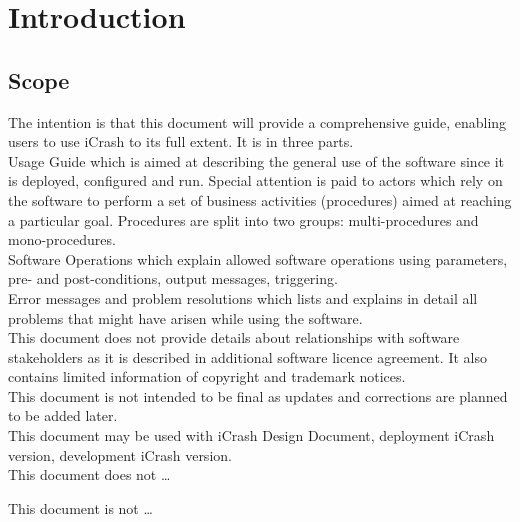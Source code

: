 \chapter{Introduction}
\label{chap:introduction}


\section{Scope}
The intention is that this document will provide a comprehensive guide, enabling
users to use iCrash to its full extent. It is in three parts.\\
 
Usage Guide which is aimed at describing the general use of the software since
it is deployed, configured and run. Special attention is paid to actors which
rely on the software to perform a set of business activities (procedures) aimed at reaching a particular goal. Procedures are split into two groups: multi-procedures and mono-procedures.\\

Software Operations which explain allowed software operations using parameters,
pre- and post-conditions, output messages, triggering.\\ 

Error messages and problem resolutions which lists and explains in detail all
problems that might have arisen while using the software. \\

This document does not provide details about relationships with software
stakeholders as it is described in additional software licence agreement. It
also contains limited information of copyright and trademark notices.\\

This document is not intended to be final as updates and corrections are planned
to be added later. \\

This document may be used with iCrash Design Document, deployment iCrash
version, development iCrash version.\\




This document does not \ldots 
 
This document is not \ldots

